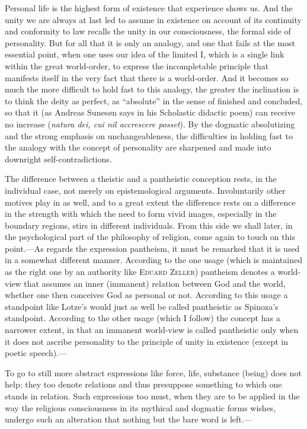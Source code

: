 \documentclass[12pt,a4paper]{book}
\newcommand{\opage}[1]{\marginnote{\footnotesize\textit{[#1]}}}
\begin{document}
Personal life is the highest form of existence that experience shows us. And
the unity we are always at last led to assume in existence on account of its
continuity and conformity to law recalls the unity in our consciousness, the
formal side of personality. But for all that it is only an analogy, and one
that fails at the most essential point, when one uses our idea of the limited
I, which is a single link within the great world-order, to express the
incompletable principle that manifests itself in the very fact that there is a
world-order. And it becomes so much the more difficult to hold fast to this
analogy, the greater the inclination is to think the deity as perfect, as
``absolute'' in the sense of finished and concluded, so that it (as Andreas
Sunesøn says in his Scholastic didactic poem) can receive no increase
(\textit{natura dei, cui nil accrescere posset}). By the dogmatic
absolutizing and the strong emphasis on unchangeableness, the difficulties in
holding fast to the analogy with the concept of personality are sharpened and
made into downright self-contradictions.

The difference between a theistic and a pantheistic conception rests, in the
individual case, not merely on epistemological arguments. Involuntarily other
motives play in as well, and to a great extent the difference rests on a
difference in the strength with which the need to form vivid images,
especially in the boundary regions, stirs in different individuals. From this
side we shall later, in the psychological part of the philosophy of religion,
\opage{46}come again to touch on this point.---As regards the expression pantheism, it
must be remarked that it is used in a somewhat different manner. According to
the one usage (which is maintained as the right one by an authority like
\textsc{Eduard Zeller}) pantheism denotes a world-view that assumes an inner
(immanent) relation between God and the world, whether one then conceives God
as personal or not. According to this usage a standpoint like Lotze's would
just as well be called pantheistic as Spinoza's standpoint. According to the
other usage (which I follow) the concept has a narrower extent, in that an
immanent world-view is called pantheistic only when it does not ascribe
personality to the principle of unity in existence (except in poetic
speech).---

To go to still more abstract expressions like force, life, substance (being)
does not help; they too denote relations and thus presuppose something to
which one stands in relation. Such expressions too must, when they are to be
applied in the way the religious consciousness in its mythical and dogmatic
forms wishes, undergo such an alteration that nothing but the bare word is
left.---
\end{document}
